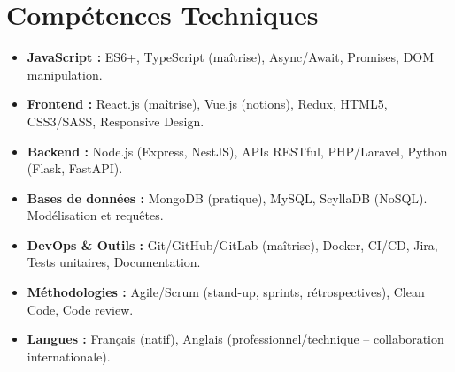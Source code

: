 \documentclass[a4paper,11pt]{article}
\begin{document}
\section{Compétences Techniques}
\begin{itemize}[leftmargin=*, nosep]
    \item \small{\textbf{JavaScript :} ES6+, TypeScript (maîtrise), Async/Await, Promises, DOM manipulation.}
    \item \small{\textbf{Frontend :} React.js (maîtrise), Vue.js (notions), Redux, HTML5, CSS3/SASS, Responsive Design.}
    \item \small{\textbf{Backend :} Node.js (Express, NestJS), APIs RESTful, PHP/Laravel, Python (Flask, FastAPI).}
    \item \small{\textbf{Bases de données :} MongoDB (pratique), MySQL, ScyllaDB (NoSQL). Modélisation et requêtes.}
    \item \small{\textbf{DevOps \& Outils :} Git/GitHub/GitLab (maîtrise), Docker, CI/CD, Jira, Tests unitaires, Documentation.}
    \item \small{\textbf{Méthodologies :} Agile/Scrum (stand-up, sprints, rétrospectives), Clean Code, Code review.}
    \item \small{\textbf{Langues :} Français (natif), Anglais (professionnel/technique -- collaboration internationale).}
\end{itemize}

\end{document}
